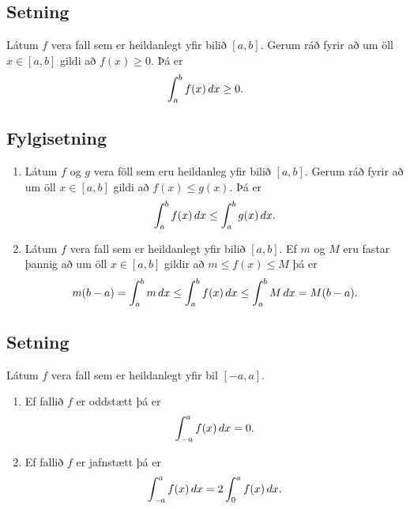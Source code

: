 \documentclass[a4paper,10pt,icelandic]{sphinxmanual}
\begin{document}
\subsection{Setning}
\label{kafli06:id5}
Látum \(f\) vera fall sem er heildanlegt yfir bilið \([a, b]\).
Gerum ráð fyrir að um öll \(x\in [a, b]\) gildi að
\(f(x)\geq 0\). Þá er
\begin{gather}
\begin{split}\int_a^b f(x)\,dx\geq 0.\end{split}\notag
\end{gather}

\subsection{Fylgisetning}
\label{kafli06:fylgisetning}\begin{enumerate}
\item {} 
Látum \(f\) og \(g\) vera föll sem eru heildanleg yfir
bilið \([a, b]\). Gerum ráð fyrir að um öll \(x\in [a, b]\)
gildi að \(f(x)\leq g(x)\). Þá er
\begin{gather}
\begin{split}\int_a^b f(x)\,dx\leq \int_a^b g(x)\,dx.\end{split}\notag
\end{gather}
\item {} 
Látum \(f\) vera fall sem er heildanlegt yfir bilið
\([a, b]\). Ef \(m\) og \(M\) eru fastar þannig að um
öll \(x\in [a, b]\) gildir að \(m\leq f(x)\leq M\) þá er
\begin{gather}
\begin{split}m(b-a)= \int_a^b m\,dx \leq  \int_a^b f(x)\,dx \leq \int_a^b M\,dx =M(b-a).\end{split}\notag
\end{gather}
\end{enumerate}


\subsection{Setning}
\label{kafli06:id6}
Látum \(f\) vera fall sem er heildanlegt yfir bil \([-a, a]\).
\begin{enumerate}
\item {} 
Ef fallið \(f\) er oddstætt þá er
\begin{gather}
\begin{split}\int_{-a}^a f(x)\,dx=0.\end{split}\notag
\end{gather}
\item {} 
Ef fallið \(f\) er jafnstætt þá er
\begin{gather}
\begin{split}\int_{-a}^a f(x)\,dx=2\int_0^a f(x)\,dx.\end{split}\notag
\end{gather}
\end{enumerate}
\end{document}
